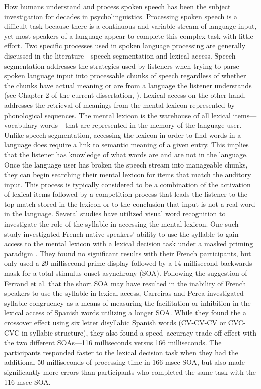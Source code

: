 \documentclass[
12pt, %
english, %
doublespacing, %
nolistspacing, %
liststotoc, %
headsepline, %
chapterinoneline, %
openany, %
]{DoctoralThesis}\usepackage[]{graphicx}\usepackage[]{color}
\begin{document}
How humans understand and process spoken speech has been the subject investigation for decades in psycholinguistics. Processing spoken speech is a difficult task because there is a continuous and variable stream of language input, yet most speakers of a language appear to complete this complex task with little effort. Two specific processes used in spoken language processing are generally discussed in the literature—speech segmentation and lexical access. 
Speech segmentation addresses the strategies used by listeners when trying to parse spoken language input into processable chunks of speech regardless of whether the chunks have actual meaning or are from a language the listener understands (see Chapter 2 of the current dissertation, \citep{Cutler2002-ge, Cutler1986-zl, Cutler1992-qq, Dumay2002-hx, Finney1996-fw, Mehler1981-le, Segui1981-uf, Tabossi2000-xn}). Lexical access on the other hand, addresses the retrieval of meanings from the mental lexicon represented by phonological sequences. The mental lexicon is the warehouse of all lexical items—vocabulary words—that are represented in the memory of the language user. Unlike speech segmentation, accessing the lexicon in order to find words in a language does require a link to semantic meaning of a given entry. This implies that the listener has knowledge of what words are and are not in the language. Once the language user has broken the speech stream into manageable chunks, they can begin searching their mental lexicon for items that match the auditory input. This process is typically considered to be a combination of the activation of lexical items followed by a competition process that leads the listener to the top match stored in the lexicon or to the conclusion that input is not a real-word in the language.
Several studies have utilized visual word recognition to investigate the role of the syllable in accessing the mental lexicon. One such study investigated French native speakers’ ability to use the syllable to gain access to the mental lexicon with a lexical decision task under a masked priming paradigm \parencite{Ferrand1996-vu}. They found no significant results with their French participants, but only used a 29 millisecond prime display followed by a 14 millisecond backwards mask for a total stimulus onset asynchrony (SOA). Following the suggestion of Ferrand et al. \parencite*{Ferrand1996-vu} that the short SOA may have resulted in the inability of French speakers to use the syllable in lexical access, Carreiras and Perea \parencite*{Carreiras2002-mp} investigated syllable congruency as a means of measuring the facilitation or inhibition in the lexical access of Spanish words utilizing a longer SOA. While they found the a crossover effect using six letter disyllabic Spanish words (CV-CV-CV or CVC-CVC in syllabic structure), they also found a speed–accuracy trade-off effect with the two different SOAs—116 milliseconds versus 166 milliseconds. The participants responded faster to the lexical decision task when they had the additional 50 milliseconds of processing time in 166 msec SOA, but also made significantly more errors than participants who completed the same task with the 116 msec SOA.
\end{document}
